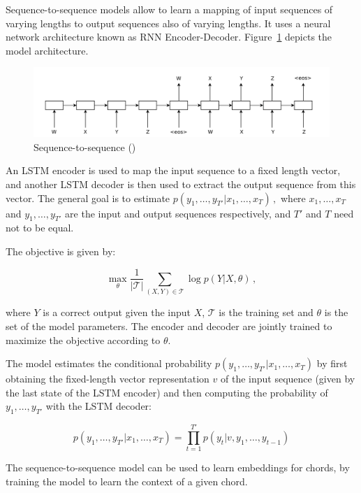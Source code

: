 \documentclass[12pt]{article}\pagestyle{myheadings}
\newcommand{\T}{\mathcal{T}}
\begin{document}
Sequence-to-sequence models allow to learn a mapping of input sequences of varying lengths to output sequences also of varying lengths. It uses a neural network architecture known as RNN Encoder-Decoder. Figure~\ref{fig:seq2seq} depicts the model architecture. 
\begin{figure}[ht]
\centering
\includegraphics[width=1.0\linewidth]{figures/seq2seq.png}
\caption{\label{fig:seq2seq}Sequence-to-sequence (\citet{SutskeverVL14})}
\end{figure}
An LSTM encoder is used to map the input sequence to a fixed length vector, and another LSTM decoder is then used to extract the output sequence from this vector. The general goal is to estimate 
$
p(y_1,\ldots,y_{T'} | x_1, \ldots, x_T)\,,
$
where $x_1, \ldots, x_T$ and  $y_1,\ldots,y_{T'}$ are the input and output sequences respectively, and $T'$ and $T$ need not to be equal. 

The objective is given by:

\begin{equation}
\max_{\theta} \frac{1}{|\T|} \sum_{(X,Y) \in \T} \log p(Y|X,\theta) \,,
\label{eq:seq2seq_obj}
\end{equation}

where $Y$ is a correct output given the input $X$, $\T$ is the training set and $\theta$ is the set of the model parameters. 
The encoder and decoder are jointly trained to maximize the objective according to $\theta$.

The model estimates the conditional probability $p(y_1,\ldots,y_{T'} | x_1, \ldots, x_T)$ by first obtaining the fixed-length vector representation $v$ of the input sequence (given by the last state of the LSTM encoder) and then computing the probability of $y_1,\ldots,y_{T'} $ with the LSTM decoder: 

\begin{equation}
p(y_1,\ldots,y_{T'} | x_1, \ldots, x_T) = \prod_{t=1}^{T'} p(y_t|v, y_1,\ldots,y_{t-1})
\end{equation}

The sequence-to-sequence model can be used to learn embeddings for chords, by training the model to learn the context of a given chord. 
\end{document}
